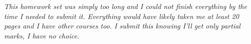 \clearpage
\emph{This homework set was simply too long and I could not finish everything by the time I needed to submit it. Everything would have likely taken me at least 20 pages and I have other courses too. I submit this knowing I'll get only partial marks, I have no choice.}